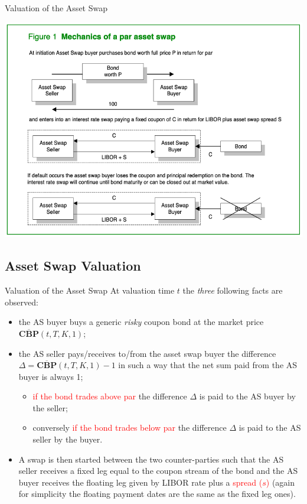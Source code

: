 \documentclass{beamer}
\begin{document}
\begin{frame}{Valuation of the Asset Swap}
	\begin{center}
		\includegraphics[width=0.7\linewidth]{asset_swap}
	\end{center}
\end{frame}

\subsection{Asset Swap Valuation}
\begin{frame}{Valuation of the Asset Swap}
	At valuation time $t$ the \emph{three} following facts are observed:
	\begin{itemize}
		\item<2-> the AS buyer buys a generic \emph{risky} coupon bond at the market price $\overline{\textbf{CBP}}(t,T,K,1)$;
		\item<3-> the AS seller pays/receives to/from the asset swap buyer the difference $\Delta = \overline{\textbf{CBP}}(t,T,K,1)-1$ in such a way that the net sum paid from the AS buyer is always 1; 
		\begin{itemize}
			\item \textcolor{red}{if the bond trades above par} the difference $\Delta$ is paid to the AS buyer by the seller;
			\item conversely \textcolor{red}{if the bond trades below par} the difference $\Delta$ is paid to the AS seller by the buyer.
		\end{itemize}
		\item<4-> A swap is then started between the two counter-parties such that the AS seller receives a fixed leg equal to the coupon stream of the bond and the AS buyer receives the floating leg given by LIBOR rate plus a \textcolor{red}{spread ($s$)} (again for simplicity the floating payment dates are the same as the fixed leg ones).
	\end{itemize}
\end{frame}
\end{document}
